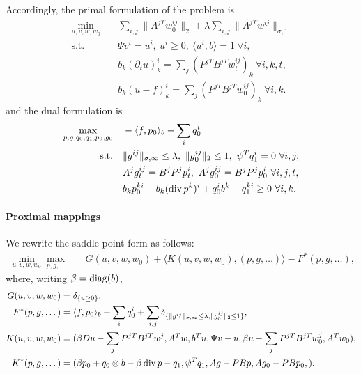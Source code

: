 Accordingly, the primal formulation of the problem is
\begin{align*}
    \min_{u,v,w,w_0} \quad
        & \sum_{i,j} \| A^{jT} w_0^{ij} \|_{2}
            + \lambda \sum_{i,j} \| A^{jT} w^{ij} \|_{\sigma,1} \\
    \text{s.t.}\quad 
        & \Psi v^i = u^i,
            ~u^i \geq 0, ~\langle u^i, b \rangle = 1 ~\forall i, \\
        & b_k (\partial_t u)_k^i = \sum_j (P^{jT}B^{jT}w^{ij}_t)_{k} ~\forall i,k,t, \\
        & b_k (u - f)_k^i = \sum_j (P^{jT}B^{jT}w_0^{ij})_{k} ~\forall i,k.
\end{align*}
and the dual formulation is
\begin{align*}
    \max_{p,g,q_0,q_1,p_0,g_0} \quad
        & - \langle f, p_0 \rangle_b - \sum_i q_0^i \\
    \text{s.t.}\quad 
        & \|g^{ij}\|_{\sigma,\infty} \leq \lambda,~ 
          \|g_0^{ij}\|_{2} \leq 1,~
          \psi^T q_1^i = 0 ~\forall i,j, \\
        & A^j g^{ij}_t = B^j P^j p^i_t,~
          A^j g_0^{ij} = B^j P^j p_0^i ~\forall i,j,t, \\
        & b_k p_0^{ki} - b_k (\operatorname{div} p^k)^i + q_0^i b^k - q_1^{ki} \geq 0 ~\forall i, k.
\end{align*}

\paragraph{Proximal mappings}

We rewrite the saddle point form as follows:
\begin{align*}
    \min_{u,v,w,w_0} \max_{p,g,\dots} \quad
        & G(u,v,w,w_0)
          + \langle K(u,v,w,w_0), (p,g,\dots) \rangle
          - F^*(p,g,\dots),
\end{align*}
where, writing $\beta = \operatorname{diag}(b)$,
\begin{align*}
    G(u,v,w,w_0) &= \delta_{\{u \geq 0\}}, \\
    F^*(p,g,\dots) &= \langle f, p_0 \rangle_b + \sum_{i} q_0^i 
        + \sum_{i,j} \delta_{\{
            \|g^{ij}\|_{\sigma,\infty} \leq \lambda,
            \|g_0^{ij}\|_{2} \leq 1
        \}}, \\
    K(u,v,w,w_0) &= (
        \beta Du - \sum_j P^{jT}B^{jT}w^{j},
        A^T w,
        b^T u,
        \Psi v - u,
        \beta u - \sum_j P^{jT}B^{jT}w_0^{j},
        A^T w_0
    ), \\
    K^*(p,g,\dots) &= (
        \beta p_0 + q_0 \otimes b - \beta \operatorname{div}{p} - q_1,
        \psi^T q_1,
        A g - PBp,
        A g_0 - PB p_0,
    ).
\end{align*}

